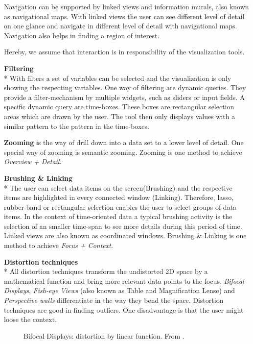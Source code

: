 Navigation can be supported by linked views and information murals, also known as navigational maps\cite{Jerding1998}. With linked views the user can see different level of detail on one glance and navigate in different level of detail with navigational maps. Navigation also helps in finding a region of interest.

Hereby, we assume that interaction is in responsibility of the visualization tools.

\textbf{Filtering}\\*
With filters a set of variables can be selected and the visualization is only showing the respecting variables.
One way of filtering are dynamic queries. They provide a filter-mechanism by multiple widgets, such as sliders or input fields\cite{Hochheiser2004,Shneiderman2008,Aigner2011}. A specific dynamic query are time-boxes. These boxes are rectangular selection areas which are drawn by the user. The tool then only displays values with a similar pattern to the pattern in the time-boxes.

\textbf{Zooming} is the way of drill down into a data set to a lower level of detail. One special way of zooming is semantic zooming\cite{boulos2003use}. Zooming is one method to achieve \textit{Overview + Detail}.

\textbf{Brushing \& Linking}\\*
The user can select data items on the screen(Brushing) and the respective items are highlighted in every connected window (Linking). Therefore, lasso, rubber-band or rectangular selection enables the user to select groups of data items\cite{tegarden1999, Aigner2011}. In the context of time-oriented data a typical brushing activity is the selection of an smaller time-span to see more details during this period of time. Linked views are also known as coordinated windows.
Brushing \& Linking is one method to achieve \textit{Focus + Context}.


\textbf{Distortion techniques}\\*
All distortion techniques transform the undistorted 2D space by a mathematical function and bring more relevant data points to the focus. \textit{Bifocal Displays}, \textit{Fish-eye Views} (also known as Table and Magnification Lense) and \textit{Perspective walls} differentiate in the way they bend the space. Distortion techniques are good in finding outliers. One disadvantage is that the user might loose the context.
\begin{figure}[H]
    \centering
    \caption{Bifocal Displays: distortion by linear function. From \cite{Stroe1999}.}
    \label{fig:bifocal}
\end{figure}

